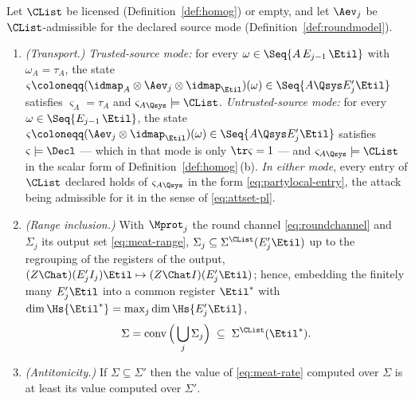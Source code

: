
\begin{lemma}\label{lem:range}
Let $\CList$ be licensed (Definition~\ref{def:homog}) or empty, and let
$\Aev_j$ be $\CList$-admissible for the declared source mode
(Definition~\ref{def:roundmodel}).
\begin{enumerate}[label=(\roman*),leftmargin=2.2em]
\item \emph{(Transport.)} \emph{Trusted-source mode:} for every
$\omega\in\Seq{A\,E_{j-1}\,\Etil}$ with $\omega_A=\tau_A$, the state
$\varsigma\coloneqq(\idmap_A\otimes\Aev_j\otimes\idmap_{\Etil})(\omega)
\in\Seq{A\Qsys E'_j\Etil}$ satisfies $\varsigma_A=\tau_A$ and
$\varsigma_{A\Qsys}\models\CList$.
\emph{Untrusted-source mode:} for every
$\omega\in\Seq{E_{j-1}\,\Etil}$, the state
$\varsigma\coloneqq(\Aev_j\otimes\idmap_{\Etil})(\omega)
\in\Seq{A\Qsys E'_j\Etil}$ satisfies $\varsigma\models\Decl$ --- which
in that mode is only $\tr\varsigma=1$ --- and
$\varsigma_{A\Qsys}\models\CList$ in the scalar form of
Definition~\ref{def:homog}\,(b). \emph{In either mode}, every entry of
$\CList$ declared  holds of $\varsigma_{A\Qsys}$ in
the form \eqref{eq:partylocal-entry}, the attack being admissible for it in
the sense of \eqref{eq:attset-pl}.
\item \emph{(Range inclusion.)} With $\Mprot_j$ the round channel
\eqref{eq:roundchannel} and $\Sigma_j$ its output set
\eqref{eq:meat-range},
$\Sigma_j\subseteq\Sigma^{\CList}(E'_j\Etil)$ up to the regrouping of the
registers of the output, $(Z\Chat)(E'_jI_j)\Etil\mapsto(Z\Chat I)(E'_j\Etil)$;
hence, embedding the finitely many $E'_j\Etil$ into a common register
$\Etil^{*}$ with $\dim\Hs{\Etil^{*}}=\max_j\dim\Hs{E'_j\Etil}$,
\begin{equation*}
  \Sigma=\operatorname{conv}\Big(\bigcup_{j}\Sigma_j\Big)
  \;\subseteq\;\Sigma^{\CList}(\Etil^{*}).
\end{equation*}
\item \emph{(Antitonicity.)} If $\Sigma\subseteq\Sigma'$ then the
value of \eqref{eq:meat-rate} computed over $\Sigma$ is at least its
value computed over $\Sigma'$.
\end{enumerate}
\end{lemma}

